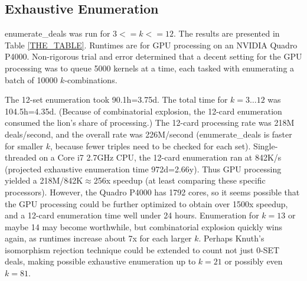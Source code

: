 \documentclass[10pt]{amsart}
\newcommand{\EDb}{{\sc enumerate\_deals }}
\begin{document}
\subsection{Exhaustive Enumeration}
\EDb was run for $3<=k<=12$. The results are presented in Table
\ref{THE_TABLE}. Runtimes are for GPU processing on an NVIDIA Quadro
P4000. Non-rigorous trial and error determined that a decent setting for the GPU
processing was to queue 5000 kernels at a time, each tasked with enumerating a
batch of 10000 $k$-combinations.

The 12-set enumeration took 90.1h=3.75d. The total time for $k=3\ldots 12$ was
104.5h=4.35d. (Because of combinatorial explosion, the 12-card enumeration
consumed the lion's share of processing.) The 12-card processing rate was 218M
deals/second, and the overall rate was 226M/second (\EDb is faster for smaller
$k$, because fewer triples need to be checked for each set). Single-threaded on
a Core i7 2.7GHz CPU, the 12-card enumeration ran at 842K/s (projected
exhaustive enumeration time 972d=2.66y). Thus GPU processing yielded a
218M/842K$\approx$256x speedup (at least comparing these specific processors).
However, the Quadro P4000 has 1792 cores, so it seems possible that the GPU
processing could be further optimized to obtain over 1500x speedup, and
a 12-card enumeration time well
under 24 hours. Enumeration for $k=13$ or maybe 14 may become worthwhile, but
combinatorial explosion quickly wins again, as runtimes increase about 7x for
each larger $k$. Perhaps Knuth's isomorphism rejection technique could be
extended to count not just 0-SET deals, making possible exhaustive
enumeration up to $k=21$ or possibly even $k=81$.
\end{document}
